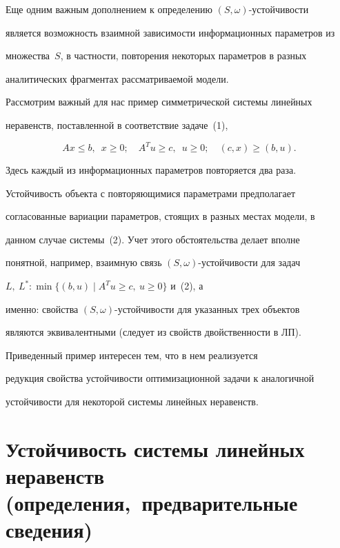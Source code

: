 Еще одним важным дополнением к определению $(S,\omega)$-устойчивости


является возможность взаимной зависимости информационных параметров из


множества~$S$, в частности, повторения некоторых параметров в разных


аналитических фрагментах рассматриваемой модели.





Рассмотрим важный для нас пример симметрической системы линейных


неравенств, поставленной в соответствие задаче~(1),


\begin{equation}


Ax\leq b,\ \; x\geq 0;\quad A^Tu\geq c,\ \; u\geq 0;


\quad (c,x)\geq (b,u).


\end{equation}


Здесь каждый из информационных параметров повторяется два раза.


Устойчивость объекта с повторяющимися параметрами предполагает


согласованные вариации параметров, стоящих в разных местах модели, в


данном случае системы~(2). Учет этого обстоятельства делает вполне


понятной, например, взаимную связь $(S,\omega)$-устойчивости для задач


$L,\ L^*: \min\{(b,u)\mid A^Tu\geq c,\ u\geq 0\}$ и~(2), а


именно: свойства $(S,\omega)$-устойчивости для указанных трех объектов


являются эквивалентными (следует из свойств двойственности в ЛП).


Приведенный пример интересен тем, что в нем реализуется


редукция свойства устойчивости оптимизационной задачи к аналогичной


устойчивости для некоторой системы линейных неравенств.





\section{Устойчивость системы линейных неравенств\protect\\


(определения,\ предварительные сведения)}





